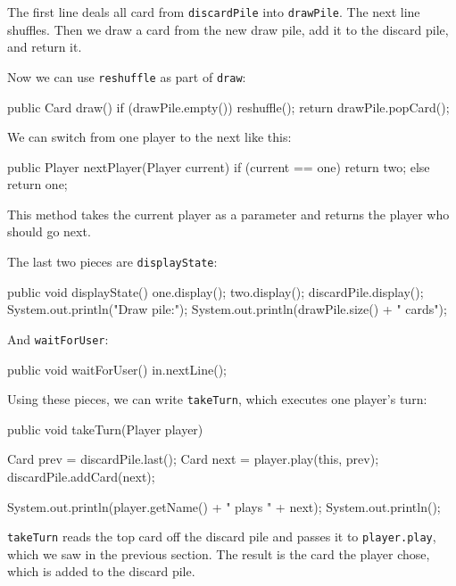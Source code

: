 \documentclass[12pt]{book}
\theoremstyle{exercise}
\newcommand{\java}[1]{\verb"#1"}
\newcommand{\java}[1]{\lstinline{#1}} %
\begin{document}
The first line deals all card from \java{discardPile} into \java{drawPile}.
The next line shuffles.
Then we draw a card from the new draw pile, add it to the discard pile, and return it.

Now we can use \java{reshuffle} as part of \java{draw}:

\begin{code}
    public Card draw() {
        if (drawPile.empty()) {
            reshuffle();
        }
        return drawPile.popCard();
    }
\end{code}


We can switch from one player to the next like this:

\begin{code}
    public Player nextPlayer(Player current) {
        if (current == one) {
            return two;
        } else {
            return one;
        }
    }
\end{code}

This method takes the current player as a parameter and returns the player who should go next.

The last two pieces are \java{displayState}:

\begin{code}
    public void displayState() {
        one.display();
        two.display();
        discardPile.display();
        System.out.println("Draw pile:");
        System.out.println(drawPile.size() + " cards");
    }
\end{code}

And \java{waitForUser}:

\begin{code}
    public void waitForUser() {
        in.nextLine();
    }
\end{code}

Using these pieces, we can write \java{takeTurn}, which executes one player's turn:

\begin{code}
    public void takeTurn(Player player) {
        Card prev = discardPile.last();
        Card next = player.play(this, prev);
        discardPile.addCard(next);    
       
        System.out.println(player.getName() + " plays " + next);
        System.out.println();
    }
\end{code}

\java{takeTurn} reads the top card off the discard pile and passes it to \java{player.play}, which we saw in the previous section.
The result is the card the player chose, which is added to the discard pile.
\end{document}

